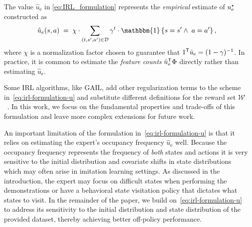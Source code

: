 The value $\hat{u}_{\mathrm{e}}$ in \eqref{eq:IRL_formulation} represents the \emph{empirical} estimate of $u_{\mathrm{e}}^{\star}$ constructed as
\begin{equation} \label{eq:definition_u_hat}
  \hat{u}_e(s,a)
  \;=\; \chi \cdot \sum_{(t, s',a') \in \mathcal{D}} \gamma^t \cdot  \mathbbm{1}\left\{s=s' \wedge\; a=a'\right\},
\end{equation}
where $\chi$ is a normalization factor chosen to guarantee that $1^{\mathsf{T}} \hat{u}_{\mathrm{e}} = (1-\gamma)^{-1}$. In practice, it is common to estimate the \emph{feature counts} $\hat{u}_{\mathrm{e}}^{\mathsf{T}} \Phi$ directly rather than estimating $\hat{u}_{\mathrm{e}}$.

Some IRL algorithms, like GAIL, add other regularization terms to the scheme in~\eqref{eq:irl-formulation-u} and substitute different definitions for the reward set $\mathcal{W}$~\cite{Ho2016}. In this work, we focus on the fundamental properties and trade-offs of this formulation and leave more complex extensions for future work.

An important limitation of the formulation in~\eqref{eq:irl-formulation-u} is that it relies on estimating the expert's occupancy frequency $\hat{u}_{\mathrm{e}}$ well. Because the occupancy frequency represents the frequency of \emph{both} states and actions it is very sensitive to the initial distribution and covariate shifts in state distributions which may often arise in imitation learning settings. As discussed in the introduction, the expert may focus on difficult states when performing the demonstrations or have a behavioral state visitation policy that dictates what states to visit. In the remainder of the paper, we build on~\eqref{eq:irl-formulation-u} to address its sensitivity to the initial distribution and state distribution of the provided dataset, thereby achieving better off-policy performance. 




